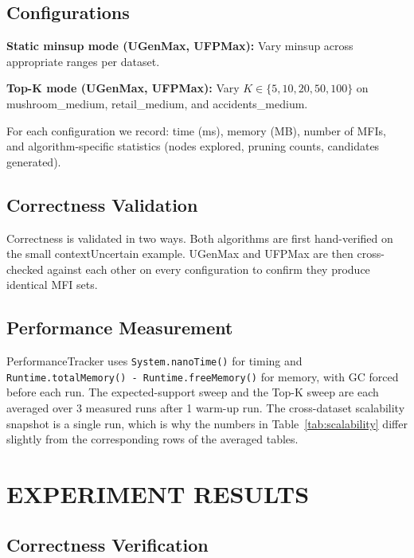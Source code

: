 \documentclass[12pt,a4paper]{report}
\begin{document}
  \section{Configurations}

  \textbf{Static minsup mode (UGenMax, UFPMax):} Vary minsup across appropriate ranges per dataset.

  \textbf{Top-K mode (UGenMax, UFPMax):} Vary $K \in \{5, 10, 20, 50, 100\}$ on mushroom\_medium, retail\_medium, and accidents\_medium.

  For each configuration we record: time (ms), memory (MB), number of MFIs, and algorithm-specific statistics (nodes explored, pruning counts, candidates generated).

  \section{Correctness Validation}

  Correctness is validated in two ways. Both algorithms are first hand-verified on the small contextUncertain example. UGenMax and UFPMax are then cross-checked against each other on every configuration to confirm they produce identical MFI sets.

  \section{Performance Measurement}

  PerformanceTracker uses \texttt{System.nanoTime()} for timing and \texttt{Runtime.totalMemory() - Runtime.freeMemory()} for memory, with GC forced before each run. The expected-support sweep and the Top-K sweep are each averaged over 3 measured runs after 1 warm-up run. The cross-dataset scalability snapshot is a single run, which is why the numbers in Table~\ref{tab:scalability} differ slightly from the corresponding rows of the averaged tables.

  \chapter{EXPERIMENT RESULTS}

  \section{Correctness Verification}
\end{document}
